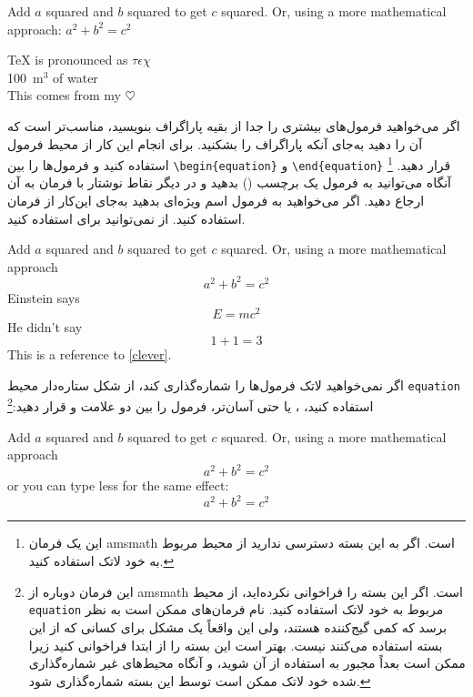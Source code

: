 \begin{example}
Add $a$ squared and $b$ squared
to get $c$ squared. Or, using 
a more mathematical approach:
$a^2 + b^2 = c^2$
\end{example}
\begin{example}
\TeX{} is pronounced as 
$\tau\epsilon\chi$\\[5pt]
100~m$^{3}$ of water\\[5pt]
This comes from my $\heartsuit$
\end{example}

اگر می‌خواهید فرمول‌های بیشتری را جدا از بقیه پاراگراف بنویسید، مناسب‌تر است که آن را 
دهید به‌جای آنکه پاراگراف را بشکنید. برای انجام این کار از محیط فرمول استفاده کنید و فرمول‌ها را بین  \verb|\begin{equation}| و
\verb|\end{equation}| قرار دهید.%
\footnote{این یک فرمان \textsf{amsmath} است. اگر به این بسته دسترسی ندارید از محیط  مربوط به خود لاتک استفاده کنید.} 
آنگاه می‌توانید به فرمول یک برچسب () بدهید و در دیگر نقاط نوشتار‌ با فرمان   به آن ارجاع دهید. اگر می‌خواهید به فرمول اسم ویژه‌ای بدهید به‌جای این‌کار از فرمان  استفاده کنید. از  نمی‌توانید برای  استفاده کنید.

\begin{example}
Add $a$ squared and $b$ squared
to get $c$ squared. Or, using
a more mathematical approach
 \begin{equation}
   a^2 + b^2 = c^2
 \end{equation}
Einstein says
 \begin{equation}
   E = mc^2 \label{clever}
 \end{equation}
He didn't say
 \begin{equation}
  1 + 1 = 3 \tag{dumb}
 \end{equation}
This is a reference to 
\eqref{clever}. 
\end{example}


اگر نمی‌خواهید لاتک فرمول‌ها را شماره‌گذاری کند، از شکل ستاره‌دار محیط  \texttt{equation} استفاده کنید، ، یا حتی آسان‌تر، فرمول را بین دو علامت  \ci{[} و \ci{]} قرار دهید:\footnote{
   این فرمان دوباره از \textsf{amsmath} است. اگر این بسته را فراخوانی نکرده‌اید، از محیط \texttt{equation} مربوط به خود لاتک استفاده کنید. نام فرمان‌های  ممکن است به نظر برسد که کمی گیج‌کننده  هستند، ولی این واقعاً یک مشکل برای کسانی که از این بسته استفاده می‌کنند نیست. بهتر است این بسته را از ابتدا فراخوانی کنید زیرا ممکن است بعداً مجبور به استفاده از آن شوید، و آنگاه محیط‌های غیر‌ شماره‌گذاری شده خود لاتک ممکن است توسط این بسته شماره‌گذاری شود.}
\begin{example}
Add $a$ squared and $b$ squared
to get $c$ squared. Or, using
a more mathematical approach
 \begin{equation*}
   a^2 + b^2 = c^2
 \end{equation*}
or you can type less for the
same effect:
 \[ a^2 + b^2 = c^2 \]
\end{example}

